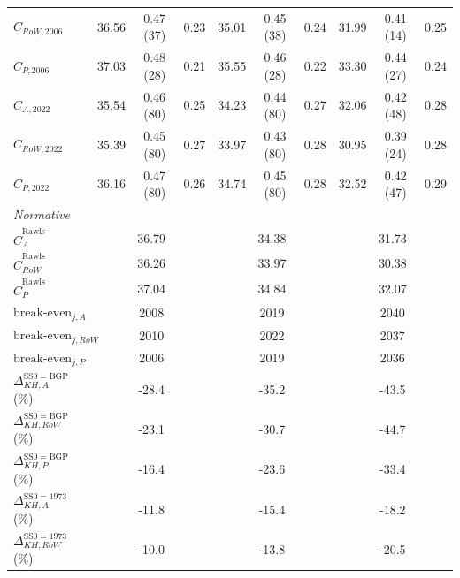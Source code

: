 \begin{table}[htbp]
\begin{tabular}{l ccc ccc ccc}
\(C_{RoW,2006}\) & 36.56 & 0.47 (37) & 0.23 & 35.01 & 0.45 (38) & 0.24 & 31.99 & 0.41 (14) & 0.25 \\
\(C_{P,2006}\) & 37.03 & 0.48 (28) & 0.21 & 35.55 & 0.46 (28) & 0.22 & 33.30 & 0.44 (27) & 0.24 \\
\(C_{A,2022}\) & 35.54 & 0.46 (80) & 0.25 & 34.23 & 0.44 (80) & 0.27 & 32.06 & 0.42 (48) & 0.28 \\
\(C_{RoW,2022}\) & 35.39 & 0.45 (80) & 0.27 & 33.97 & 0.43 (80) & 0.28 & 30.95 & 0.39 (24) & 0.28 \\
\(C_{P,2022}\) & 36.16 & 0.47 (80) & 0.26 & 34.74 & 0.45 (80) & 0.28 & 32.52 & 0.42 (47) & 0.29 \\
\addlinespace
\textit{Normative} & \multicolumn{3}{c}{} & \multicolumn{3}{c}{} & \multicolumn{3}{c}{} \\
\midrule
\(\hat{C}^{\mathrm{Rawls}}_{A}\) & \multicolumn{3}{c}{36.79} & \multicolumn{3}{c}{34.38} & \multicolumn{3}{c}{31.73} \\
\(\hat{C}^{\mathrm{Rawls}}_{RoW}\) & \multicolumn{3}{c}{36.26} & \multicolumn{3}{c}{33.97} & \multicolumn{3}{c}{30.38} \\
\(\hat{C}^{\mathrm{Rawls}}_{P}\) & \multicolumn{3}{c}{37.04} & \multicolumn{3}{c}{34.84} & \multicolumn{3}{c}{32.07} \\
\(\text{break-even}_{j,A}\) & \multicolumn{3}{c}{2008} & \multicolumn{3}{c}{2019} & \multicolumn{3}{c}{2040} \\
\(\text{break-even}_{j,RoW}\) & \multicolumn{3}{c}{2010} & \multicolumn{3}{c}{2022} & \multicolumn{3}{c}{2037} \\
\(\text{break-even}_{j,P}\) & \multicolumn{3}{c}{2006} & \multicolumn{3}{c}{2019} & \multicolumn{3}{c}{2036} \\
\(\Delta_{KH,A}^{\mathrm{SS0=BGP}}\) (\%) & \multicolumn{3}{c}{-28.4} & \multicolumn{3}{c}{-35.2} & \multicolumn{3}{c}{-43.5} \\
\(\Delta_{KH,RoW}^{\mathrm{SS0=BGP}}\) (\%) & \multicolumn{3}{c}{-23.1} & \multicolumn{3}{c}{-30.7} & \multicolumn{3}{c}{-44.7} \\
\(\Delta_{KH,P}^{\mathrm{SS0=BGP}}\) (\%) & \multicolumn{3}{c}{-16.4} & \multicolumn{3}{c}{-23.6} & \multicolumn{3}{c}{-33.4} \\
\(\Delta_{KH,A}^{\mathrm{SS0=1973}}\) (\%) & \multicolumn{3}{c}{-11.8} & \multicolumn{3}{c}{-15.4} & \multicolumn{3}{c}{-18.2} \\
\(\Delta_{KH,RoW}^{\mathrm{SS0=1973}}\) (\%) & \multicolumn{3}{c}{-10.0} & \multicolumn{3}{c}{-13.8} & \multicolumn{3}{c}{-20.5} \\

\end{tabular}
\end{table}
